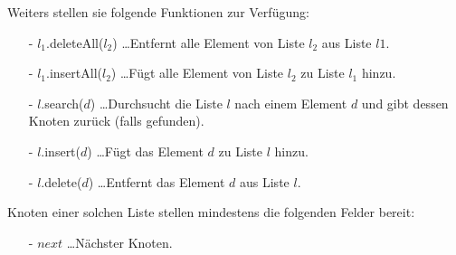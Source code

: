 \documentclass{article}
\begin{document}
\noindent
Weiters stellen sie folgende Funktionen zur Verf{\"u}gung:
\begin{itemize}
  \item[-] $l_1$.deleteAll($l_2$) \ldots Entfernt alle Element von Liste $l_2$ aus
    Liste $l1$.
  \item[-] $l_1$.insertAll($l_2$) \ldots F{\"u}gt alle Element von Liste $l_2$ zu
    Liste $l_1$ hinzu.
  \item[-] $l$.search($d$) \ldots Durchsucht die Liste $l$ nach einem Element $d$
    und gibt dessen Knoten zur{\"u}ck (falls gefunden).
  \item[-] $l$.insert($d$) \ldots F{\"u}gt das Element $d$ zu Liste $l$ hinzu.
  \item[-] $l$.delete($d$) \ldots Entfernt das Element $d$ aus Liste $l$.
\end{itemize}
%
Knoten einer solchen Liste stellen mindestens die folgenden Felder bereit:
\begin{itemize}
  \item[-] $next$ \ldots N{\"a}chster Knoten.
\end{itemize}
%
\end{document}
